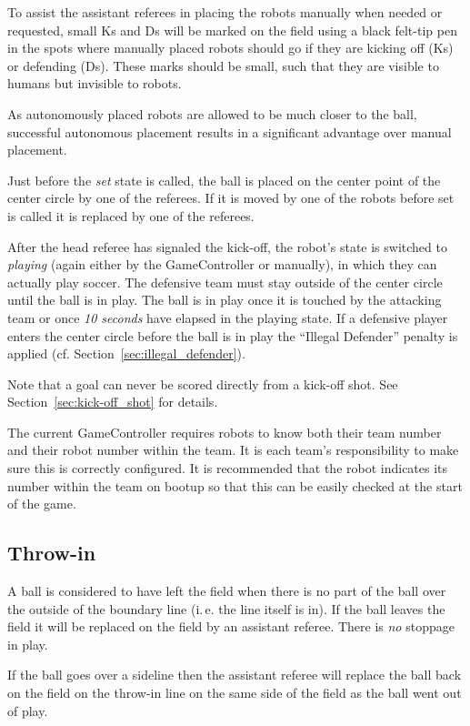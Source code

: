 \documentclass[12pt]{article}
\newcommand{\ie}{\mbox{i.\,e.}\xspace}
\newcommand{\cf}{\mbox{cf.}\xspace}
\begin{document}
To assist the assistant referees in placing the robots manually when needed or requested, small Ks and Ds will be marked on the field using a black felt-tip pen in the spots where manually placed robots should go if they are kicking off (Ks) or defending (Ds).  These marks should be small, such that they are visible to humans but invisible to robots.

As autonomously placed robots are allowed to be much closer to the ball, successful autonomous placement results in a significant advantage over manual placement.

Just before the \emph{set} state is called, the ball is placed on the center point of the center circle by one of the referees. If it is moved by one of the robots before set is called it is replaced by one of the referees.

After the head referee has signaled the kick-off, the robot's state is switched to \emph{playing} (again either by the GameController or manually), in which they can actually play soccer.
The defensive team must stay outside of the center circle until the ball is in play.  The ball is in play once it is touched by the attacking team or once \emph{10 seconds} have elapsed in the playing state. If a defensive player enters the center circle before the ball is in play the ``Illegal Defender'' penalty is applied (\cf Section~\ref{sec:illegal_defender}).

Note that a goal can never be scored directly from a kick-off shot. See Section~\ref{sec:kick-off_shot} for details.

The current GameController requires robots to know both their team number and their robot number within the team. It is each team's responsibility to make sure this is correctly configured. It is recommended that the robot indicates its number within the team on bootup so that this can be easily checked at the start of the game.

\subsection{Throw-in}
\label{sec:throw_in}

A ball is considered to have left the field when there is no part of the ball over the outside of the boundary line (\ie the line itself is in). If the ball leaves the field it will be replaced on the field by an assistant referee. There is \emph{no} stoppage in play.

If the ball goes over a sideline then the assistant referee will replace the ball back on the field on the throw-in line on the same side of the field as the ball went out of play.
\end{document}
